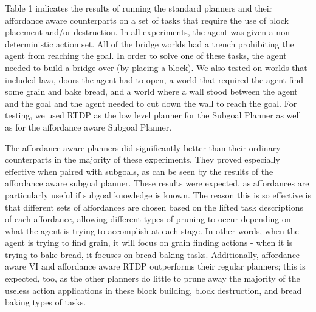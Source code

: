 \documentclass[]{article}
\begin{document}
%
%



Table 1 indicates the results of running the standard planners and their affordance
aware counterparts on a set of tasks that require the use of block placement and/or
destruction. In all experiments, the agent was given a non-deterministic action set.
All of the bridge worlds had a trench prohibiting the agent from reaching the goal. In order
to solve one of these tasks, the agent needed to build a bridge over (by placing a block). We also
tested on worlds that included lava, doors the agent had to open, a world that required the agent find some grain and bake bread, and a 
world where a wall stood between the agent and the goal and the agent needed to cut down the wall
to reach the goal. For testing, we used RTDP as the low level planner for the Subgoal Planner
as well as for the affordance aware Subgoal Planner.

The affordance aware planners did significantly better than their ordinary counterparts in the majority
of these experiments. They proved especially effective when paired with subgoals, as can be seen by the
results of the affordance aware subgoal planner. These results were expected, as affordances are particularly
useful if subgoal knowledge is known. The reason this is so effective is that different sets
of affordances are chosen based on the lifted task descriptions of each affordance, allowing different types
of pruning to occur depending on what the agent is trying to accomplish at each stage. In other words, when the agent
is trying to find grain, it will focus on grain finding actions - when it is trying to bake bread, it focuses on bread baking tasks.
Additionally, affordance aware VI and affordance aware RTDP outperforms their regular planners; this is expected, too, as the other
planners do little to prune away the majority of the useless action applications in these block building,
block destruction, and bread baking types of tasks.
\end{document}
